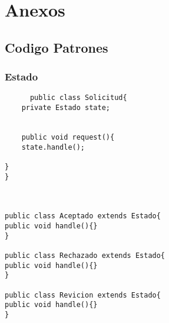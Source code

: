 \chapter*{Anexos}
\section{Codigo Patrones}
\subsection{Estado}
\begin{lstlisting}
	  public class Solicitud{ 
	private Estado state;
	
	
	public void request(){
	state.handle();
	
}
}



public class Aceptado extends Estado{
public void handle(){}
}

public class Rechazado extends Estado{
public void handle(){}
}

public class Revicion extends Estado{
public void handle(){}
}


\end{lstlisting}

\newpage
